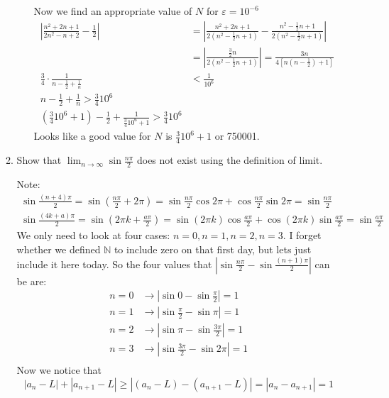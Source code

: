 \documentclass[letterpaper]{article}
\begin{document}
\begin{enumerate}
\begin{enumerate}
\begin{enumerate}
    Now we find an appropriate value of $N$ for $\varepsilon=10^{-6}$
    \begin{align*}
      \left\lvert\frac{n^2+2n+1}{2n^2-n+2}-\frac{1}{2}\right\rvert&=
      \left\lvert\frac{n^2+2n+1}{2(n^2-\frac{1}{2}n+1)}-\frac{n^2-\frac{1}{2}n+1}{2(n^2-\frac{1}{2}n+1)}\right\rvert\\
      &=\left\lvert\frac{\frac{3}{2}n}{2(n^2-\frac{1}{2}n+1)}\right\rvert=\frac{3n}{4[n(n-\frac{1}{2})+1]}\\
      \frac{3}{4}\cdot\frac{1}{n-\frac{1}{2}+\frac{1}{n}}&<\frac{1}{10^6}\\
      n-\frac{1}{2}+\frac{1}{n}>\frac{3}{4}10^6\\
      (\frac{3}{4}10^6+1)-\frac{1}{2}+\frac{1}{\frac{3}{4}10^6+1}>\frac{3}{4}10^6
    \end{align*}
    Looks like a good value for $N$ is $\frac{3}{4}10^6+1$ or 750001.
    \end{enumerate}
  \item
  Show that $\displaystyle \lim_{n\to\infty}\sin\frac{n\pi}{2}$ does not exist using the definition of limit.

  Note:
  \begin{gather*}
    \sin\frac{(n+4)\pi}{2}=\sin\left(\frac{n\pi}{2}+2\pi\right)=\sin\frac{n\pi}{2}\cos 2\pi+\cos\frac{n\pi}{2}\sin 2\pi=\sin\frac{n\pi}{2}\\
    \sin\frac{(4k+a)\pi}{2}=\sin\left(2\pi k+\frac{a\pi}{2}\right)=\sin(2\pi k)\cos\frac{a\pi}{2}+\cos(2\pi k)\sin\frac{a\pi}{2}=\sin\frac{a\pi}{2}
  \end{gather*}
  We only need to look at four cases: $n=0, n=1, n=2, n=3$. I forget whether we defined $\mathbb{N}$ to include zero on that first day, but lets just include it here today. So the four values that $\left\lvert\sin\frac{n\pi}{2}-\sin\frac{(n+1)\pi}{2}\right\rvert$ can be are:
  \begin{align*}
    n=0&\to
    \left\lvert\sin 0-\sin\frac{\pi}{2}\right\rvert=1\\
    n=1&\to
    \left\lvert\sin\frac{\pi}{2}-\sin \pi\right\rvert=1\\
    n=2&\to
    \left\lvert\sin\pi-\sin\frac{3\pi}{2}\right\rvert=1\\
    n=3&\to
    \left\lvert\sin\frac{3\pi}{2}-\sin2\pi\right\rvert=1\\
  \end{align*}
  Now we notice that 
  \[\left\lvert a_n-L\right\rvert+\left\lvert a_{n+1}-L\right\rvert\ge \left\lvert(a_n-L)-(a_{n+1}-L)\right\rvert=\left\lvert a_n-a_{n+1}\right\rvert=1\]


\end{enumerate}
\end{enumerate}
\end{document}
